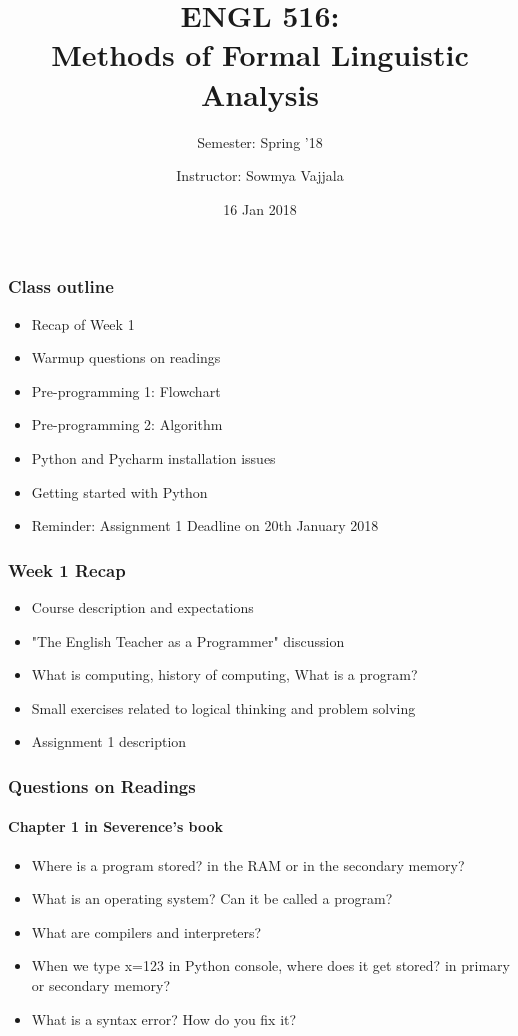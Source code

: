 \documentclass{beamer}
\author[Sowmya Vajjala]{Instructor: Sowmya Vajjala}
\title[ENGL 516]{ENGL 516: \\ Methods of Formal Linguistic Analysis}
\subtitle{Semester: Spring '18}
\date{16 Jan 2018}
\institute{Iowa State University, USA}
\begin{document}
\begin{frame}\titlepage
\end{frame}

\begin{frame}
\frametitle{Class outline}
\begin{itemize}
\item Recap of Week 1 %
\item Warmup questions on readings%
\item Pre-programming 1: Flowchart %
\item Pre-programming 2: Algorithm %
\item Python and Pycharm installation issues
\item Getting started with Python
\item Reminder: Assignment 1 Deadline on 20th January 2018
\end{itemize}
\end{frame}

\begin{frame}
\frametitle{Week 1 Recap}
\begin{itemize}
\item Course description and expectations
\item "The English Teacher as a Programmer" discussion
\item What is computing, history of computing, What is a program?
\item Small exercises related to logical thinking and problem solving
\item Assignment 1 description
\end{itemize}
\end{frame}

\begin{frame}
\frametitle{Questions on Readings}
\framesubtitle{Chapter 1 in Severence's book}
\begin{itemize}
\item Where is a program stored? in the RAM or in the secondary memory? \pause
\item What is an operating system? Can it be called a program? \pause
\item What are compilers and interpreters? \pause
\item When we type x=123 in Python console, where does it get stored? in primary or secondary memory? \pause
\item What is a syntax error? How do you fix it?
\end{itemize}
\end{frame}
\end{document}
